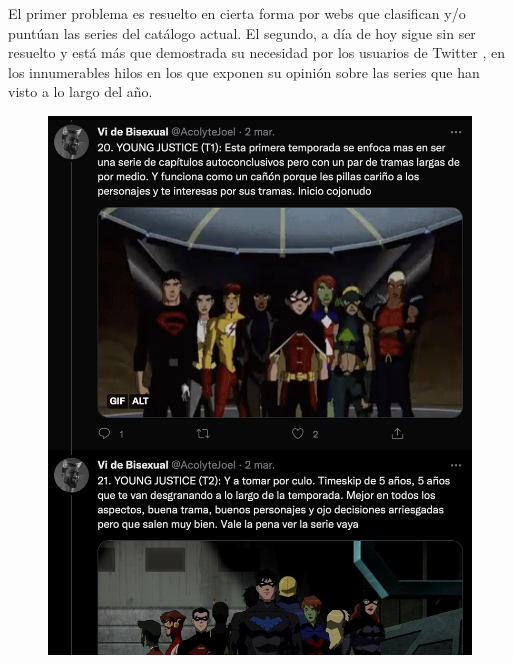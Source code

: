 El primer problema es resuelto en cierta forma por webs que clasifican y/o puntúan las series del catálogo actual. El segundo, a día de hoy sigue sin ser resuelto y está más que demostrada su necesidad por los usuarios de Twitter \cite{Twitter}, en los innumerables hilos en los que exponen su opinión sobre las series que han visto a lo largo del año.
\begin{figure}[]
	\centering	
	\includegraphics[scale=0.25]{img/twitter-thread-1.png}

\end{figure}
